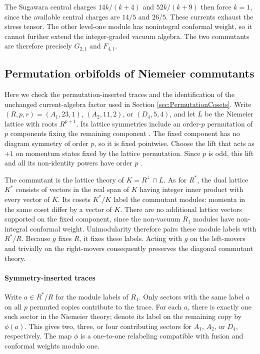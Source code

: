 \documentclass[12pt]{article}
\numberwithin{equation}{section}
\theoremstyle{remark}
\begin{document}
The Sugawara central charges $14k/(k+4)$ and $52k/(k+9)$ then force $k=1$, since the available central charges are $14/5$ and $26/5$. These currents exhaust the stress tensor. The other level-one module has nonintegral conformal weight, so it cannot further extend the integer-graded vacuum algebra. The two commutants are therefore precisely $G_{2,1}$ and $F_{4,1}$.


\subsection{Permutation orbifolds of Niemeier commutants}
\label{app:PermutationCosets}

Here we check the permutation-inserted traces and the identification of the unchanged current-algebra factor used in Section \ref{sec:PermutationCosets}. Write $(R,p,r)=(A_1,23,1)$, $(A_2,11,2)$, or $(D_4,5,4)$, and let $L$ be the Niemeier lattice with roots $R^{p+1}$. Its lattice symmetries include an order-$p$ permutation of $p$ components fixing the remaining component \cite{Conway:1999dov}. The fixed component has no diagram symmetry of order $p$, so it is fixed pointwise. Choose the lift that acts as $+1$ on momentum states fixed by the lattice permutation. Since $p$ is odd, this lift and all its non-identity powers have order $p$ \cite{vanEkeren:2017scl}. 

The commutant is the lattice theory of $K=R^\perp\cap L$. As for $R^*$, the dual lattice $K^*$ consists of vectors in the real span of $K$ having integer inner product with every vector of $K$. Its cosets $K^*/K$ label the commutant modules: momenta in the same coset differ by a vector of $K$. There are no additional lattice vectors supported on the fixed component, since the non-vacuum $R_1$ modules have non-integral conformal weight. Unimodularity therefore pairs these module labels with $R^*/R$.
 Because $g$ fixes $R$, it fixes these labels. Acting with $g$ on the left-movers and trivially on the right-movers consequently preserves the diagonal commutant theory.

\paragraph{Symmetry-inserted traces}
Write $a\in R^*/R$ for the module labels of $R_1$. Only sectors with the same label $a$ on all $p$ permuted copies contribute to the trace. For each $a$, there is exactly one such sector in the Niemeier theory; denote its label on the remaining copy by $\phi(a)$. This gives two, three, or four contributing sectors for $A_1$, $A_2$, or $D_4$, respectively. The map $\phi$ is a one-to-one relabeling compatible with fusion and conformal weights modulo one.
\end{document}
